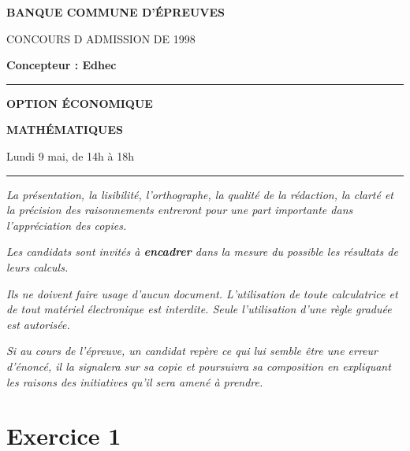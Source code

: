 \documentclass[11pt]{article}%
\begin{document}

\begin{center}
{\LARG\E\textbf{BANQUE COMMUNE D'ÉPREUVES}}



{\large \textsc{CONCOURS D ADMISSION DE 1998}}



{\large \textbf{Concepteur : Edhec}}



\rule{2.39cm}{0.05cm}



{\Large \textbf{OPTION ÉCONOMIQUE}}



{\Large \textbf{MATHÉMATIQUES }}



{\Large Lundi 9 mai, de 14h à 18h}



\rule{2.39cm}{0.05cm}
\end{center}

\textit{La présentation, la lisibilité, l'orthographe, la qualité
de la rédaction, la clarté et la précision des raisonnements
entreront pour une part importante dans l'appréciation des copies.}

\textit{Les candidats sont invités à \textbf{encadrer} dans la mesure
du possible les résultats de leurs calculs.}

\textit{Ils ne doivent faire usage d'aucun document. L'utilisation de
toute
calculatrice et de tout matériel électronique est interdite. Seule
l'utilisation d'une règle graduée est autorisée.}

\textit{Si au cours de l'épreuve, un candidat repère ce qui lui semble
être une erreur d'énoncé, il la signalera sur sa copie et
poursuivra sa composition en expliquant les raisons des initiatives
qu'il sera
amené à prendre.}

\vspace*{3cm}

\section*{Exercice 1}
\end{document}

